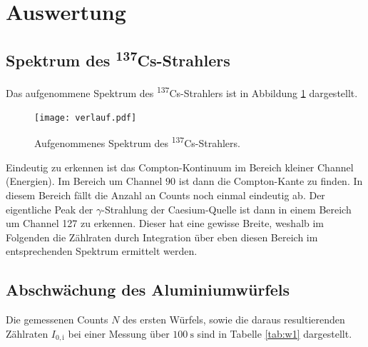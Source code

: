 \section{Auswertung}
\label{sec:Auswertung}

\subsection{Spektrum des \textsuperscript{137}Cs-Strahlers}

Das aufgenommene Spektrum des \textsuperscript{137}Cs-Strahlers ist in Abbildung
\ref{fig:verlauf} dargestellt.

\begin{figure}[H]
  \centering
  \texttt{[image: verlauf.pdf]}
  \caption{Aufgenommenes Spektrum des \textsuperscript{137}Cs-Strahlers.}
  \label{fig:verlauf}
\end{figure}

Eindeutig zu erkennen ist das Compton-Kontinuum im Bereich kleiner Channel (Energien).
Im Bereich um Channel $90$ ist dann die Compton-Kante zu finden. In diesem Bereich
fällt die Anzahl an Counts noch einmal eindeutig ab. Der eigentliche Peak der $\gamma$-Strahlung der Caesium-Quelle
ist dann in einem Bereich um Channel 127 zu erkennen. Dieser hat eine gewisse Breite,
weshalb im Folgenden die Zählraten durch Integration über eben diesen Bereich im
entsprechenden Spektrum ermittelt werden.

\subsection{Abschwächung des Aluminiumwürfels}
Die gemessenen Counts $N$ des ersten Würfels, sowie die daraus resultierenden Zählraten  $I_{0,\mathrm{i}}$ bei einer Messung
über $\SI{100}{\second}$ sind in Tabelle \ref{tab:w1} dargestellt.

